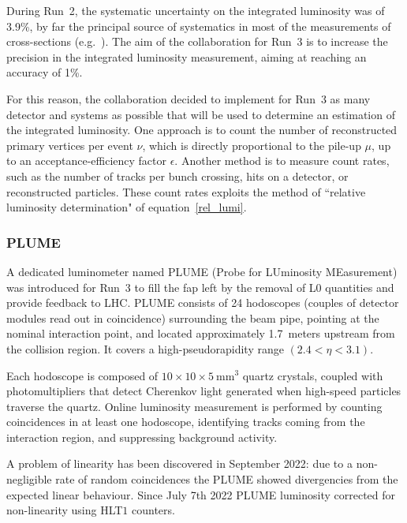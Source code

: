 During Run~2, the systematic uncertainty on the integrated luminosity was of 3.9\%, by far the principal source of systematics in most of the measurements of cross-sections (e.g.~\cite{j-psi}). The aim of the collaboration for Run~3 is to increase the precision in the integrated luminosity measurement, aiming at reaching an accuracy of 1\%\cite{Aaij:1951625}. 

For this reason, the collaboration decided to implement for Run~3 as many detector and systems as possible that will be used to determine an estimation of the integrated luminosity.
One approach is to count the number of reconstructed primary vertices per event $\nu$, which is directly proportional to the pile-up $\mu$, up to an acceptance-efficiency factor $\epsilon$. Another method is to measure count rates, such as the number of tracks per bunch crossing, hits on a detector, or reconstructed particles. These count rates exploits the method of ``relative luminosity determination" of equation~\eqref{rel_lumi}.

\subsubsection{PLUME}
A dedicated luminometer named PLUME (Probe for LUminosity MEasurement) was introduced for Run~3 to fill the fap left by the removal of L$0$ quantities  and provide feedback to LHC. PLUME consists of 24 hodoscopes (couples of detector modules read out in coincidence) surrounding the beam pipe, pointing at the nominal interaction point, and located approximately 1.7~meters upstream from the collision region. It covers a high-pseudorapidity range $(2.4 < \eta < 3.1)$.

Each hodoscope is composed of $10 \times 10 \times \SI{5}{\milli\meter\tothe{3}}$ quartz crystals, coupled with photomultipliers that detect Cherenkov light generated when high-speed particles traverse the quartz. Online luminosity measurement is performed by counting coincidences in at least one hodoscope, identifying tracks coming from the interaction region, and suppressing background activity.

A problem of linearity has been discovered in September 2022: due to a non-negligible rate of random coincidences the PLUME showed divergencies from the expected linear behaviour. Since July 7th 2022 PLUME luminosity corrected for non-linearity using HLT$1$ counters.


